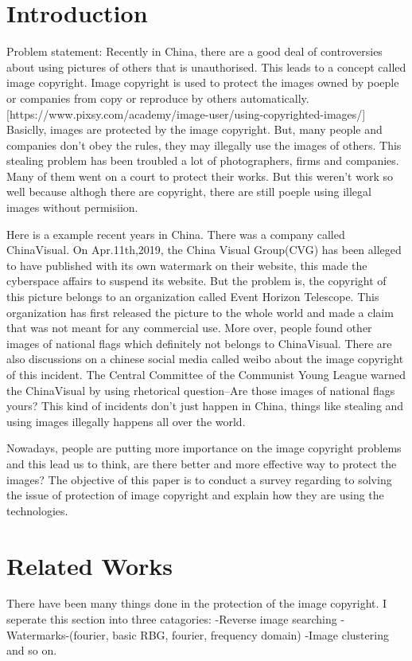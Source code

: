 \section{Introduction}
Problem statement:
Recently in China, 
there are a good deal of controversies about using pictures of others that is unauthorised.
This leads to a concept called image copyright.
Image copyright is used to protect the images owned by poeple or companies from copy or reproduce by others automatically.[https://www.pixsy.com/academy/image-user/using-copyrighted-images/]
Basiclly, images are protected by the image copyright.
But, many people and companies don't obey the rules, 
they may illegally use the images of others.
This stealing problem has been troubled a lot of photographers, firms and companies.
Many of them went on a court to protect their works. 
But this weren't work so well because althogh there are copyright, 
there are still poeple using illegal images  without permisiion.

Here is a example recent years in China.
There was a company called ChinaVisual.
On Apr.11th,2019, 
the China Visual Group(CVG) has been alleged to have published with its own watermark on their website, 
this made the cyberspace affairs to suspend its website.
But the problem is, the copyright of this picture belongs to an organization called Event Horizon Telescope. 
This organization has first released the picture to the whole world and made a claim that was not meant for any commercial use.
More over, people found other images of national flags which definitely not belongs to ChinaVisual.
There are also discussions on a chinese social media called weibo about the image copyright of this incident. 
The Central Committee of the Communist Young League warned the ChinaVisual by using rhetorical question--Are those images of national flags yours?
This kind of incidents don't just happen in China, things like stealing and using images illegally happens all over the world.

Nowadays, people are putting more importance on the image copyright problems and this lead us to think,
are there better and more effective way to protect the images?
The objective of this paper is to conduct a survey regarding to solving the issue of protection of image copyright and explain how they are using the technologies.

\section{Related Works}
There have been many things done in the protection of the image copyright. 
I seperate this section into three catagories: 
-Reverse image searching
-Watermarks-(fourier, basic RBG, fourier, frequency domain)
-Image clustering and so on.

